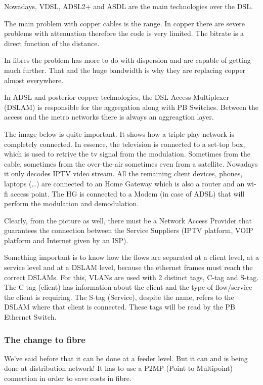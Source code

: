 Nowadays, VDSL, ADSL2+ and ASDL are the main technologies over the DSL.


The main problem with copper cables is the range. In copper there are severe problems with attenuation therefore the code is very limited. The bitrate is a direct function of the distance.

In fibres the problem has more to do with dispersion and are capable of getting much further. That and the huge bandwidth is why they are replacing copper almost everywhere.


In ADSL and posterior copper technologies, the DSL Access Multiplexer (DSLAM) is responsible for the aggregation along with PB Switches. Between the access and the metro networks there is always an aggreagtion layer.

The image below is quite important. It shows how a triple play network is completely connected. In essence, the television is connected to a set-top box, which is used to retrive the tv signal from the modulation. Sometimes from the cable, sometimes from the over-the-air sometimes even from a satellite. Nowadays it only decodes IPTV video stream. All the remaining client devices, phones, laptops (\dots) are connected to an Home Gateway which is also a router and an wi-fi access point. The HG is connected to a Modem (in case of ADSL) that will perform the modulation and demodulation. 


Clearly, from the picture as well, there must be a Network Access Provider that guarantees the connection between the Service Suppliers (IPTV platform, VOIP platform and Internet given by an ISP).

Something important is to know how the flows are separated at a client level, at a service level and at a DSLAM level, because the ethernet frames must reach the correct DSLAMs. For this, VLANs are used with 2 distinct tags, C-tag and S-tag. The C-tag (client) has information about the client and the type of flow/service the client is requiring. The S-tag (Service), despite the name, refers to the DSLAM where that client is connected. These tags will be read by the PB Ethernet Switch.



\subsubsection*{The change to fibre}
We've said before that it can be done at a feeder level. But it can and is being done at distribution network! It has to use a P2MP (Point to Multipoint) connection in order to save costs in fibre. 

